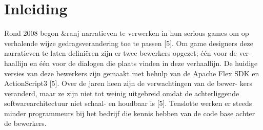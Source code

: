 \chapter{Inleiding}
Rond 2008 begon &ranj narratieven te verwerken in hun serious games om op
verhalende wijze gedragsverandering toe te passen [5]. Om game designers deze
narratieven te laten definiëren zijn er twee bewerkers opgezet; één voor de ver-
haallijn en één voor de dialogen die plaats vinden in deze verhaallijn. De huidige
versies van deze bewerkers zijn gemaakt met behulp van de Apache Flex SDK
en ActionScript3 [5]. Over de jaren heen zijn de verwachtingen van de bewer-
kers veranderd, maar ze zijn niet tot weinig uitgebreid omdat de achterliggende
softwarearchitectuur niet schaal- en houdbaar is [5]. Tenslotte werken er steeds
minder programmeurs bij het bedrijf die kennis hebben van de code base achter
de bewerkers.

